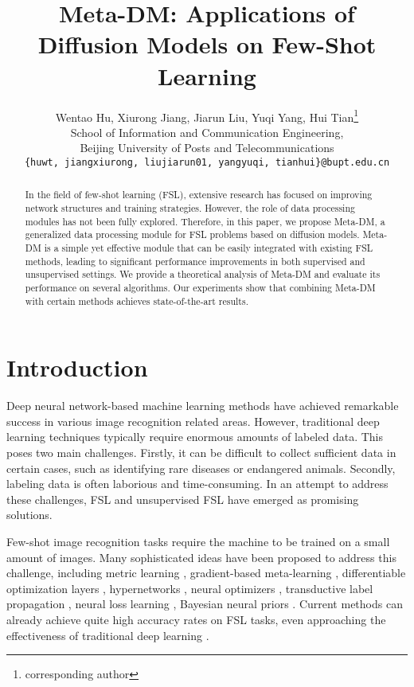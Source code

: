 \documentclass{article}
\title{Meta-DM: Applications of Diffusion Models on Few-Shot Learning}
\author{Wentao Hu, Xiurong Jiang, Jiarun Liu, Yuqi Yang, Hui Tian\thanks{corresponding author} \\
  School of Information and Communication Engineering,\\
  Beijing University of Posts and Telecommunications\\
  \texttt{\{huwt, jiangxiurong, liujiarun01, yangyuqi, tianhui\}@bupt.edu.cn} \\
}
\begin{document}
   

\maketitle


\begin{abstract}
   In the field of few-shot learning (FSL), extensive research has focused on improving network structures and training strategies. However, the role of data processing modules has not been fully explored. Therefore, in this paper, we propose Meta-DM, a generalized data processing module for FSL problems based on diffusion models. Meta-DM is a simple yet effective module that can be easily integrated with existing FSL methods, leading to significant performance improvements in both supervised and unsupervised settings. We provide a theoretical analysis of Meta-DM and evaluate its performance on several algorithms. Our experiments show that combining Meta-DM with certain methods achieves state-of-the-art results. 
\end{abstract}


\section{Introduction}
Deep neural network-based machine learning methods have achieved remarkable success in various image recognition related areas. However, traditional deep learning techniques typically require enormous amounts of labeled data. This poses two main challenges. Firstly, it can be difficult to collect sufficient data in certain cases, such as identifying rare diseases or endangered animals. Secondly, labeling data is often laborious and time-consuming. In an attempt to address these challenges, FSL and unsupervised FSL have emerged as promising solutions.


Few-shot image recognition tasks require the machine to be trained on a small amount of images. Many sophisticated ideas have been proposed to address this challenge, including metric learning \cite{i1,i2,i4}, gradient-based meta-learning \cite{i9}, differentiable optimization layers \cite{i11}, hypernetworks \cite{i14}, neural optimizers \cite{i16}, transductive label propagation \cite{i6}, neural loss learning \cite{i15}, Bayesian neural priors \cite{i17}. Current methods can already achieve quite high accuracy rates on FSL tasks, even approaching the effectiveness of traditional deep learning \cite{i7,i19,i10}. 
\end{document}
